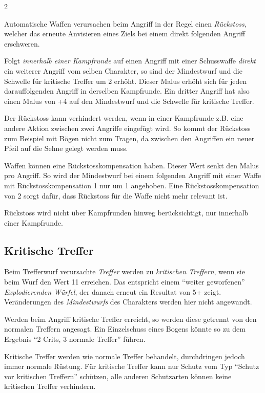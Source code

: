 \begin{multicols}{2}
{Automatische Waffen verursachen beim Angriff in der Regel einen \textit{Rückstoss}, welcher das erneute Anvisieren eines Ziels bei einem direkt folgenden Angriff erschweren.

Folgt \textit{innerhalb einer Kampfrunde} auf einen Angriff mit einer Schusswaffe \textit{direkt} ein weiterer Angriff vom selben Charakter, so sind der Mindestwurf und die Schwelle für kritische Treffer um 2 erhöht. Dieser Malus erhöht sich für jeden darauffolgenden Angriff in derselben Kampfrunde. Ein dritter Angriff hat also einen Malus von +4 auf den Mindestwurf und die Schwelle für kritische Treffer.

Der Rückstoss kann verhindert werden, wenn in einer Kampfrunde z.B. eine andere Aktion zwischen zwei Angriffe eingefügt wird. So kommt der Rückstoss zum Beispiel mit Bögen nicht zum Tragen, da zwischen den Angriffen ein neuer Pfeil auf die Sehne gelegt werden muss.

Waffen können eine Rückstosskompensation haben. Dieser Wert senkt den Malus pro Angriff. So wird der Mindestwurf bei einem folgenden Angriff mit einer Waffe mit Rückstosskompensation 1 nur um 1 angehoben. Eine Rückstosskompensation von 2 sorgt dafür, dass Rückstoss für die Waffe nicht mehr relevant ist.

Rückstoss wird nicht über Kampfrunden hinweg berücksichtigt, nur innerhalb einer Kampfrunde.
}

\subsection{Kritische Treffer}

Beim Trefferwurf verursachte \textit{Treffer} werden zu \textit{kritischen Treffern}, wenn sie beim Wurf den Wert 11 erreichen. Das entspricht einem ``weiter geworfenen'' \textit{Explodierenden Würfel}, der danach erneut ein Resultat von 5+ zeigt. Veränderungen des \textit{Mindestwurfs} des Charakters werden hier nicht angewandt.


Werden beim Angriff kritische Treffer erreicht, so werden diese getrennt von den normalen Treffern angesagt. Ein Einzelschuss eines Bogens könnte so zu dem Ergebnis ``2 Crits, 3 normale Treffer'' führen.

Kritische Treffer werden wie normale Treffer behandelt, durchdringen jedoch immer normale Rüstung. Für kritische Treffer kann nur Schutz vom Typ ``Schutz vor kritischen Treffern'' schützen, alle anderen Schutzarten können keine kritischen Treffer verhindern.


\end{multicols}

